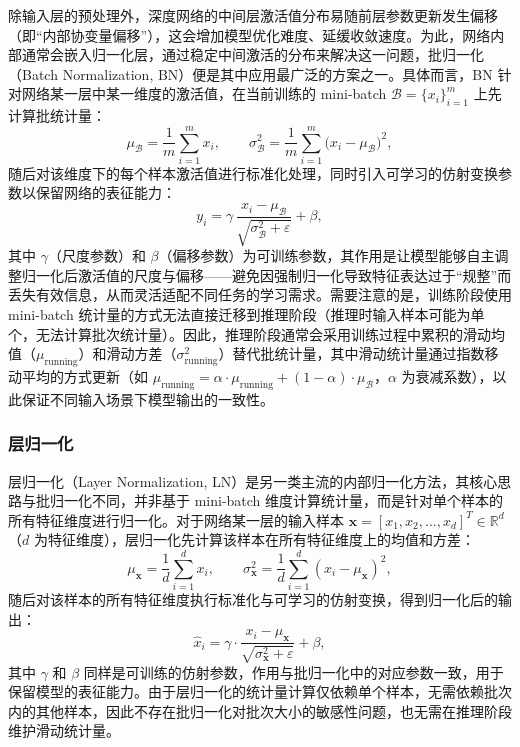 除输入层的预处理外，深度网络的中间层激活值分布易随前层参数更新发生偏移（即“内部协变量偏移”），这会增加模型优化难度、延缓收敛速度。为此，网络内部通常会嵌入归一化层，通过稳定中间激活的分布来解决这一问题，批归一化（Batch Normalization, BN）便是其中应用最广泛的方案之一。具体而言，BN 针对网络某一层中某一维度的激活值，在当前训练的 mini-batch $\mathcal{B}=\{x_i\}_{i=1}^{m}$ 上先计算批统计量：
\begin{equation}
    \mu_{\mathcal{B}} = \frac{1}{m}\sum_{i=1}^{m} x_i, \qquad
    \sigma_{\mathcal{B}}^{2} = \frac{1}{m}\sum_{i=1}^{m} \bigl(x_i-\mu_{\mathcal{B}}\bigr)^2,
\end{equation}
随后对该维度下的每个样本激活值进行标准化处理，同时引入可学习的仿射变换参数以保留网络的表征能力：
\begin{equation}
    y_i = \gamma\,\frac{x_i-\mu_{\mathcal{B}}}{\sqrt{\sigma_{\mathcal{B}}^{2}+\varepsilon}} + \beta,
\end{equation}
其中 $\gamma$（尺度参数）和 $\beta$（偏移参数）为可训练参数，其作用是让模型能够自主调整归一化后激活值的尺度与偏移——避免因强制归一化导致特征表达过于“规整”而丢失有效信息，从而灵活适配不同任务的学习需求。需要注意的是，训练阶段使用 mini-batch 统计量的方式无法直接迁移到推理阶段（推理时输入样本可能为单个，无法计算批次统计量）。因此，推理阶段通常会采用训练过程中累积的滑动均值（$\mu_{\text{running}}$）和滑动方差（$\sigma_{\text{running}}^2$）替代批统计量，其中滑动统计量通过指数移动平均的方式更新（如 $\mu_{\text{running}} = \alpha \cdot \mu_{\text{running}} + (1-\alpha) \cdot \mu_{\mathcal{B}}$，$\alpha$ 为衰减系数），以此保证不同输入场景下模型输出的一致性。

\subsubsection{层归一化}

层归一化（Layer Normalization, LN）是另一类主流的内部归一化方法，其核心思路与批归一化不同，并非基于 mini-batch 维度计算统计量，而是针对单个样本的所有特征维度进行归一化。对于网络某一层的输入样本 $\mathbf{x} = [x_1, x_2, ..., x_d]^T \in \mathbb{R}^d$（$d$ 为特征维度），层归一化先计算该样本在所有特征维度上的均值和方差：
\begin{equation}
    \mu_{\mathbf{x}} = \frac{1}{d}\sum_{i=1}^{d} x_i, \qquad
    \sigma_{\mathbf{x}}^2 = \frac{1}{d}\sum_{i=1}^{d} (x_i - \mu_{\mathbf{x}})^2,
\end{equation}
随后对该样本的所有特征维度执行标准化与可学习的仿射变换，得到归一化后的输出：
\begin{equation}
    \hat{x}_i = \gamma \cdot \frac{x_i - \mu_{\mathbf{x}}}{\sqrt{\sigma_{\mathbf{x}}^2 + \varepsilon}} + \beta,
\end{equation}
其中 $\gamma$ 和 $\beta$ 同样是可训练的仿射参数，作用与批归一化中的对应参数一致，用于保留模型的表征能力。由于层归一化的统计量计算仅依赖单个样本，无需依赖批次内的其他样本，因此不存在批归一化对批次大小的敏感性问题，也无需在推理阶段维护滑动统计量。

